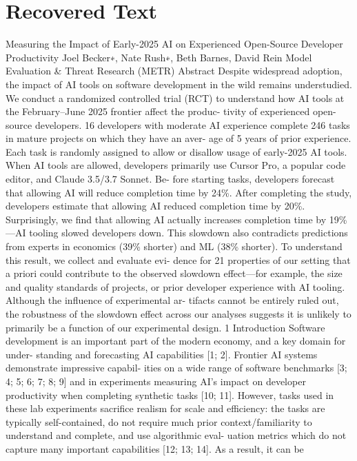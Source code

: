 \section{Recovered Text}
Measuring the Impact of Early-2025 AI on
Experienced Open-Source Developer Productivity
Joel Becker∗, Nate Rush∗, Beth Barnes, David Rein
Model Evaluation \& Threat Research (METR)
Abstract
Despite widespread adoption, the impact of AI tools on software development in
the wild remains understudied. We conduct a randomized controlled trial (RCT)
to understand how AI tools at the February–June 2025 frontier affect the produc-
tivity of experienced open-source developers. 16 developers with moderate AI
experience complete 246 tasks in mature projects on which they have an aver-
age of 5 years of prior experience. Each task is randomly assigned to allow or
disallow usage of early-2025 AI tools. When AI tools are allowed, developers
primarily use Cursor Pro, a popular code editor, and Claude 3.5/3.7 Sonnet. Be-
fore starting tasks, developers forecast that allowing AI will reduce completion
time by 24\%. After completing the study, developers estimate that allowing AI
reduced completion time by 20\%. Surprisingly, we find that allowing AI actually
increases completion time by 19\%—AI tooling slowed developers down. This
slowdown also contradicts predictions from experts in economics (39\% shorter)
and ML (38\% shorter). To understand this result, we collect and evaluate evi-
dence for 21 properties of our setting that a priori could contribute to the observed
slowdown effect—for example, the size and quality standards of projects, or prior
developer experience with AI tooling. Although the influence of experimental ar-
tifacts cannot be entirely ruled out, the robustness of the slowdown effect across
our analyses suggests it is unlikely to primarily be a function of our experimental
design.
1
Introduction
Software development is an important part of the modern economy, and a key domain for under-
standing and forecasting AI capabilities [1; 2]. Frontier AI systems demonstrate impressive capabil-
ities on a wide range of software benchmarks [3; 4; 5; 6; 7; 8; 9] and in experiments measuring AI’s
impact on developer productivity when completing synthetic tasks [10; 11]. However, tasks used in
these lab experiments sacrifice realism for scale and efficiency: the tasks are typically self-contained,
do not require much prior context/familiarity to understand and complete, and use algorithmic eval-
uation metrics which do not capture many important capabilities [12; 13; 14]. As a result, it can be
